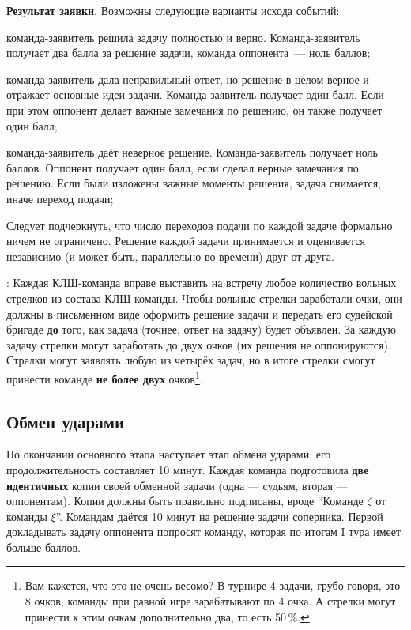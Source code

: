 \documentclass[12pt]{article}
\begin{document}
\noindent\textbf{Результат заявки}. Возможны следующие варианты исхода событий:
\begin{list}{)}{\leftmargin=6mm  \topsep=0mm  \itemsep=1pt \parsep=0mm \itemindent=10pt}
\item команда-заявитель решила задачу полностью и верно. Команда-заявитель получает два балла за решение задачи, команда оппонента~--- ноль баллов;
\item команда-заявитель дала неправильный ответ, но решение в целом верное и отражает основные идеи задачи.  Команда-заявитель получает один балл. Если при этом оппонент делает важные замечания по решению, он также получает один балл;
\item команда-заявитель даёт неверное решение. Команда-заявитель получает ноль баллов. Оппонент получает один балл, если сделал верные замечания по решению. Если были изложены важные моменты решения, задача снимается, иначе переход подачи;
\end{list}
Следует подчеркнуть, что число переходов подачи по каждой задаче формально ничем не ограничено. Решение каждой задачи принимается и оценивается независимо (и может быть, параллельно во времени) друг от друга.

: Каждая КЛШ-команда вправе выставить на встречу любое количество вольных стрелков из состава КЛШ-команды. Чтобы вольные стрелки заработали очки, они должны в письменном виде оформить решение задачи и передать его судейской бригаде {\bf до} того, как задача (точнее, ответ на задачу) будет объявлен. За каждую задачу стрелки могут заработать до двух очков (их решения не оппонируются). Стрелки могут заявлять любую из четырёх задач, но в итоге стрелки смогут принести команде {\bf не более двух} очков\footnote{Вам кажется, что это не очень весомо? В турнире 4 задачи, грубо говоря, это 8 очков, команды при равной игре зарабатывают по 4 очка. А стрелки могут принести к этим очкам дополнительно два, то есть 50\,\%.}.

\subsection*{Обмен ударами}
По окончании основного этапа наступает этап обмена ударами; его продолжительность составляет 10 минут. Каждая команда подготовила {\bf две идентичных} копии своей обменной задачи (одна --- судьям, вторая --- оппонентам). Копии должны быть правильно подписаны, вроде ``Команде $\zeta$ от команды $\xi$''. Командам даётся 10 минут на решение задачи соперника. Первой докладывать задачу оппонента попросят команду, которая по итогам I тура имеет больше баллов.
\end{document}
